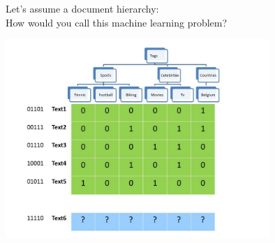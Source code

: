 \documentclass[]{beamer}
\renewcommand{\vec}[1]{\boldsymbol{#1}}
\begin{document}
%
%
%
%
%
%
%



%
%
%


\begin{frame}{Let's assume a document hierarchy: \\
How would you call this machine learning problem?}
\begin{center}
\includegraphics[width=0.75\textwidth,trim = 0 0 100 0,clip]{Figures/pictures/Slide5}
\end{center}
\end{frame}
\end{document}
